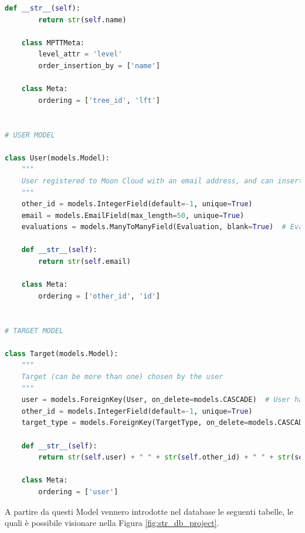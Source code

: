 \begin{lstlisting}[language=Python, label=lst:model, caption={Parti principali del codice dei Models della soluzione.}]
    def __str__(self):
        return str(self.name)
 
    class MPTTMeta:
        level_attr = 'level'
        order_insertion_by = ['name']
 
    class Meta:
        ordering = ['tree_id', 'lft']
 
 
# USER MODEL
 
class User(models.Model):
    """
    User registered to Moon Cloud with an email address, and can insert Target and launch Evaluations
    """
    other_id = models.IntegerField(default=-1, unique=True)
    email = models.EmailField(max_length=50, unique=True)
    evaluations = models.ManyToManyField(Evaluation, blank=True)  # Evaluations chosen by user
 
    def __str__(self):
        return str(self.email)
 
    class Meta:
        ordering = ['other_id', 'id']
 
 
# TARGET MODEL
 
class Target(models.Model):
    """
    Target (can be more than one) chosen by the user
    """
    user = models.ForeignKey(User, on_delete=models.CASCADE)  # User has chosen a target_type
    other_id = models.IntegerField(default=-1, unique=True)
    target_type = models.ForeignKey(TargetType, on_delete=models.CASCADE)  # TargetType Id
 
    def __str__(self):
        return str(self.user) + " " + str(self.other_id) + " " + str(self.target_type)
 
    class Meta:
        ordering = ['user']
\end{lstlisting}
%
A partire da questi Model vennero introdotte nel database le seguenti tabelle, le quali è possibile visionare nella Figura 
\ref{fig:str_db_project}.
